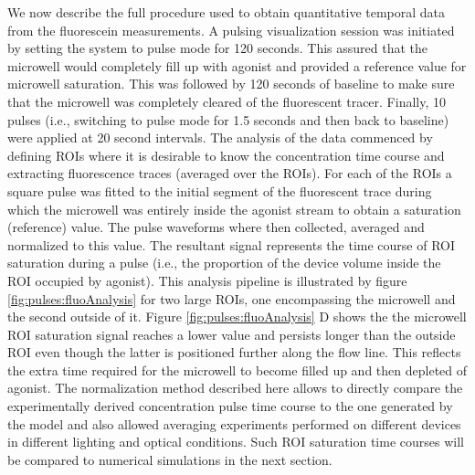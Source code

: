  We now describe the full procedure used to obtain quantitative temporal data from the fluorescein measurements. A pulsing visualization session was initiated by setting the system to pulse mode for 120 seconds. This assured that the microwell would completely fill up with agonist and provided a reference value for microwell saturation. This was followed by 120 seconds of baseline to make sure that the microwell was completely cleared of the fluorescent tracer. Finally, 10 pulses (i.e., switching to pulse mode for 1.5 seconds and then back to baseline) were applied at 20 second intervals. The analysis of the data commenced by defining ROIs where it is desirable to know the concentration time course and extracting fluorescence traces (averaged over the ROIs). For each of the ROIs a square pulse was fitted to the initial segment of the fluorescent trace during which the microwell was entirely inside the agonist stream to obtain a saturation (reference) value. The pulse waveforms where then collected, averaged and normalized to this value. The resultant signal represents the time course of  ROI saturation during a pulse (i.e., the proportion of the device volume inside the ROI occupied by agonist). This analysis pipeline is illustrated by figure \ref{fig:pulses:fluoAnalysis} for two large ROIs, one encompassing the microwell and the second outside of it. Figure \ref{fig:pulses:fluoAnalysis} D shows the the microwell ROI saturation signal reaches a lower value and persists longer than the outside ROI even though the latter is positioned further along the flow line. This reflects the extra time required for the microwell to become filled up and then depleted of agonist. The normalization method described here allows to directly compare the experimentally derived concentration pulse time course to the one generated by the model and also allowed averaging experiments performed on different devices in different lighting and optical conditions. Such ROI saturation time courses will be compared to numerical simulations in the next section.


